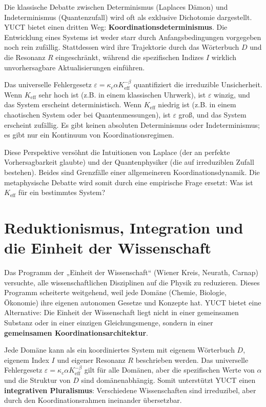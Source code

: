 \documentclass[12pt,a4paper]{article}
\begin{document}
	Die klassische Debatte zwischen Determinismus (Laplaces Dämon) und Indeterminismus (Quantenzufall) wird oft als exklusive Dichotomie dargestellt. YUCT bietet einen dritten Weg: \textbf{Koordinationsdeterminismus}. Die Entwicklung eines Systems ist weder starr durch Anfangsbedingungen vorgegeben noch rein zufällig. Stattdessen wird ihre Trajektorie durch das Wörterbuch \(D\) und die Resonanz \(R\) eingeschränkt, während die spezifischen Indizes \(I\) wirklich unvorhersagbare Aktualisierungen einführen.
	
	Das universelle Fehlergesetz \(\varepsilon = \kappa_c \alpha K_{\mathrm{eff}}^{-\beta}\) quantifiziert die irreduzible Unsicherheit. Wenn \(K_{\mathrm{eff}}\) sehr hoch ist (z.B. in einem klassischen Uhrwerk), ist \(\varepsilon\) winzig, und das System erscheint deterministisch. Wenn \(K_{\mathrm{eff}}\) niedrig ist (z.B. in einem chaotischen System oder bei Quantenmessungen), ist \(\varepsilon\) groß, und das System erscheint zufällig. Es gibt keinen absoluten Determinismus oder Indeterminismus; es gibt nur ein Kontinuum von Koordinationsregimen.
	
	Diese Perspektive versöhnt die Intuitionen von Laplace (der an perfekte Vorhersagbarkeit glaubte) und der Quantenphysiker (die auf irreduziblen Zufall bestehen). Beides sind Grenzfälle einer allgemeineren Koordinationsdynamik. Die metaphysische Debatte wird somit durch eine empirische Frage ersetzt: Was ist \(K_{\mathrm{eff}}\) für ein bestimmtes System?
	
	\section{Reduktionismus, Integration und die Einheit der Wissenschaft}
	
	Das Programm der „Einheit der Wissenschaft“ (Wiener Kreis, Neurath, Carnap) versuchte, alle wissenschaftlichen Disziplinen auf die Physik zu reduzieren. Dieses Programm scheiterte weitgehend, weil jede Domäne (Chemie, Biologie, Ökonomie) ihre eigenen autonomen Gesetze und Konzepte hat. YUCT bietet eine Alternative: Die Einheit der Wissenschaft liegt nicht in einer gemeinsamen Substanz oder in einer einzigen Gleichungsmenge, sondern in einer \textbf{gemeinsamen Koordinationsarchitektur}.
	
	Jede Domäne kann als ein koordiniertes System mit eigenem Wörterbuch \(D\), eigenem Index \(I\) und eigener Resonanz \(R\) beschrieben werden. Das universelle Fehlergesetz \(\varepsilon = \kappa_c \alpha K_{\mathrm{eff}}^{-\beta}\) gilt für alle Domänen, aber die spezifischen Werte von \(\alpha\) und die Struktur von \(D\) sind domänenabhängig. Somit unterstützt YUCT einen \textbf{integrativen Pluralismus}: Verschiedene Wissenschaften sind irreduzibel, aber durch den Koordinationsrahmen ineinander übersetzbar.
	
\end{document}
